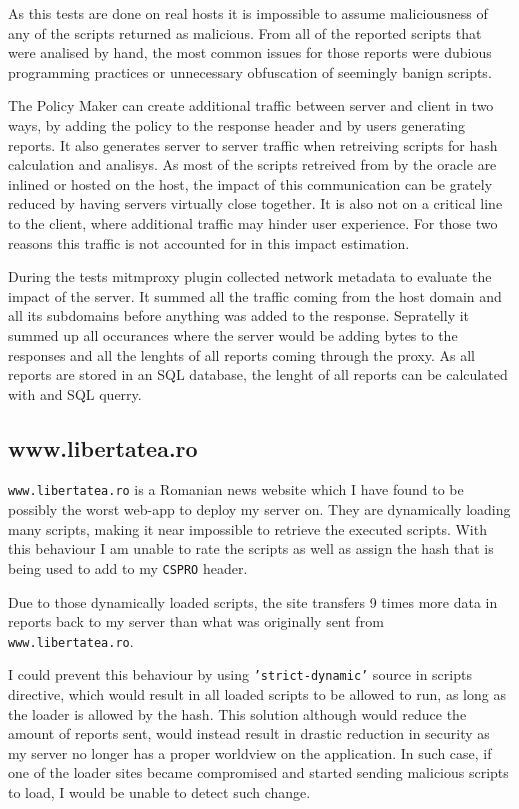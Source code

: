 As this tests are done on real hosts it is impossible to assume maliciousness of any of the scripts returned as malicious.
From all of the reported scripts that were analised by hand, the most common issues for those reports were dubious programming practices or unnecessary obfuscation of seemingly banign scripts.

The Policy Maker can create additional traffic between server and client in two ways, by adding the policy to the response header and by users generating reports.
It also generates server to server traffic when retreiving scripts for hash calculation and analisys.
As most of the scripts retreived from by the oracle are inlined or hosted on the host, the impact of this communication can be grately reduced by having servers virtually close together.
It is also not on a critical line to the client, where additional traffic may hinder user experience.
For those two reasons this traffic is not accounted for in this impact estimation.

During the tests mitmproxy plugin collected network metadata to evaluate the impact of the server.
It summed all the traffic coming from the host domain and all its subdomains before anything was added to the response.
Sepratelly it summed up all occurances where the server would be adding bytes to the responses and all the lenghts of all reports coming through the proxy.
As all reports are stored in an SQL database, the lenght of all reports can be calculated with and SQL querry.

\subsection{www.libertatea.ro}

\texttt{www.libertatea.ro} is a Romanian news website which I have found to be possibly the worst web-app to deploy my server on.
They are dynamically loading many scripts, making it near impossible to retrieve the executed scripts.
With this behaviour I am unable to rate the scripts as well as assign the hash that is being used to add to my \texttt{CSPRO} header.

Due to those dynamically loaded scripts, the site transfers 9 times more data in reports back to my server than what was originally sent from \texttt{www.libertatea.ro}.

I could prevent this behaviour by using \texttt{'strict-dynamic'} source in scripts directive, which would result in all loaded scripts to be allowed to run, as long as the loader is allowed by the hash.
This solution although would reduce the amount of reports sent, would instead result in drastic reduction in security as my server no longer has a proper worldview on the application.
In such case, if one of the loader sites became compromised and started sending malicious scripts to load, I would be unable to detect such change.

